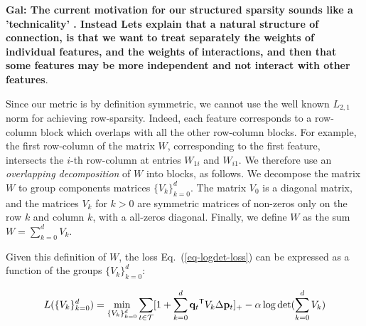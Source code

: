 \documentclass[twoside,11pt]{article}
\newcommand\mat[1]{{#1}}
\renewcommand\vec[1]{\mathbf{#1}}
\newcommand{\T}{{}^\mathsf{T}}
\newcommand{\W}{\mat{W}}
\newcommand{\q}{{\vec{q}}}
\newcommand{\trip}{{t}}
\newcommand{\qt}{{\q_{\trip}}}
\newcommand{\Vk}{\mat{V_k}}
\newcommand{\Vz}{\mat{V_0}}
\newcommand{\Vg}{\{\Vk\}_{k=0}^{d}} %
\renewcommand{\eqref}[1]{Eq.~(\ref{#1})}
\begin{document}
{\bf Gal: The current motivation  for our structured sparsity sounds like a 'technicality' . Instead Lets explain that a natural structure of connection, is that we want to treat separately the weights of individual features, and the weights of interactions, and then that some features may be more independent and not interact with other features}. 

Since our metric is by definition symmetric, we cannot use the well known $L_{2,1}$ norm \citep{evgeniou2007multi} for achieving row-sparsity. Indeed, each feature corresponds to a row-column block which overlaps with all the other row-column blocks. For example, the first row-column of the matrix $\W$, corresponding to the first feature, intersects the $i$-th row-column at entries $W_{1i}$ and $W_{i1}$. We therefore use an \emph{overlapping decomposition} \citep{jacob2009group,obozinski2011group} of $W$ into blocks, as follows. 
We decompose the matrix $\W$ to group components matrices $\Vg$. The matrix $V_0$ is a diagonal matrix, and the matrices $V_k$ for $k>0$ are symmetric matrices of non-zeros only on the row $k$ and column $k$, with a all-zeros diagonal. Finally, we define $\W$ as the sum $\W = \sum_{k=0}^{d}{\Vk}$.





Given this definition of $\W$, the loss \eqref{eq-logdet-loss} can be expressed as a function of the groups $\Vg$:

\begin{equation}
L(\Vg) = 
  \min_{\Vg} \sum_{\trip \in \cal{T}}  [1+\sum_{k=0}^{d}{\qt\T \Vk\Delta \vec{p}_t } ]_{+} - \alpha \log \det(\sum_{k=0}^{d}{\Vk})
  \label{group_loss}
\end{equation} 
\end{document}
